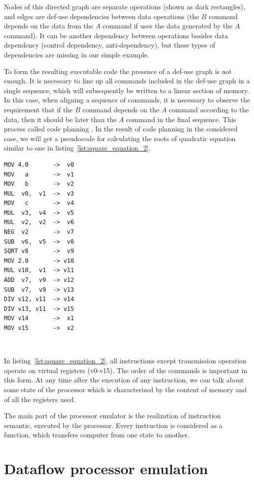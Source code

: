 \documentclass[
11pt,%
tightenlines,%
twoside,%
onecolumn,%
nofloats,%
nobibnotes,%
nofootinbib,%
superscriptaddress,%
noshowpacs,%
centertags]%
{revtex4}
\begin{document}
Nodes of this directed graph are separate operations (shown as dark rectangles), and edges are def-use dependencies between data operations (the $B$ command depends on the data from the $A$ command if uses the data generated by the $A$ command).
It can be another dependency between operations besides data dependency (control dependency, anti-dependency), but these types of dependencies are missing in our simple example.

To form the resulting executable code the presence of a def-use graph is not enough.
It is necessary to line up all commands included in the def-use graph in a single sequence, which will subsequently be written to a linear section of memory.
In this case, when aligning a sequence of commands, it is necessary to observe the requirement that if the $B$ command depends on the $A$ command according to the data, then it should be later than the $A$ command in the final sequence.
This process called code planning \cite{Aho}.
In the result of code planning in the considered case, we will get a pseudocode for calculating the roots of quadratic equation similar to one in listing~\ref{lst:square_equation_2}.

\begin{lstlisting}[caption={Pseudocode for calculating the roots of  quadratic equation.},label={lst:square_equation_2}]
MOV 4.0       ->  v0
MOV   a       ->  v1
MOV   b       ->  v2
MUL  v0,  v1  ->  v3
MOV   c       ->  v4
MUL  v3,  v4  ->  v5
MUL  v2,  v2  ->  v6
NEG  v2       ->  v7
SUB  v6,  v5  ->  v8
SQRT v8       ->  v9
MOV 2.0       -> v10
MUL v10,  v1  -> v11
ADD  v7,  v9  -> v12
SUB  v7,  v9  -> v13
DIV v12, v11  -> v14
DIV v13, v11  -> v15
MOV v14       ->  x1
MOV v15       ->  x2
\end{lstlisting}

\

In listing~\ref{lst:square_equation_2}, all instructions except transmission operation operate on virtual registers (v0-v15).
The order of the commands is important in this form.
At any time after the execution of any instruction, we can talk about some state of the processor which is characterized by the content of memory and of all the registers used.

The main part of the processor emulator is the realization of instruction semantic, executed by the processor.
Every instruction is considered as a function, which transfers computer from one state to another.

\section{Dataflow processor emulation}
\end{document}
